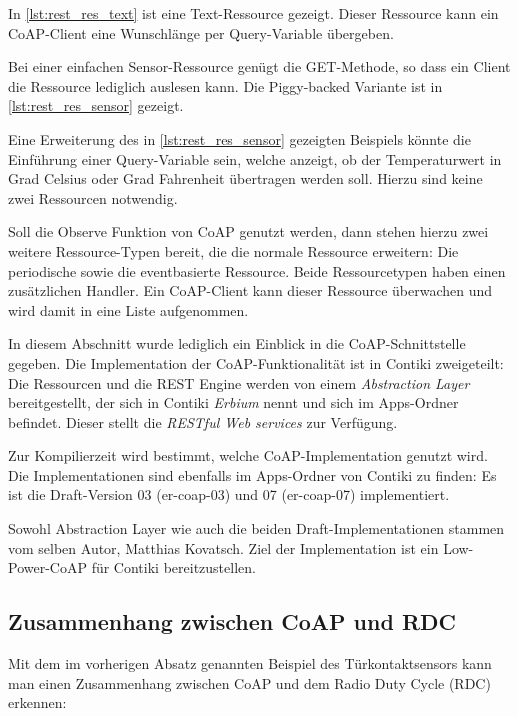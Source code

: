 	In \autoref{lst:rest_res_text} ist eine Text-Ressource gezeigt.
	Dieser Ressource kann ein CoAP-Client eine Wunschlänge
	per Query-Variable übergeben.

	

	Bei einer einfachen Sensor-Ressource genügt die GET-Methode, so dass
	ein Client die Ressource lediglich auslesen kann. Die Piggy-backed
	Variante ist in \autoref{lst:rest_res_sensor} gezeigt.

	

	Eine Erweiterung des in \autoref{lst:rest_res_sensor} gezeigten
	Beispiels könnte die Einführung einer Query-Variable sein,
	welche anzeigt, ob der Temperaturwert in Grad Celsius
	oder Grad Fahrenheit übertragen werden soll. Hierzu sind keine zwei
	Ressourcen notwendig.

	Soll die Observe Funktion von CoAP genutzt werden, dann stehen hierzu
	zwei weitere Ressource-Typen bereit, die die normale Ressource
	erweitern: Die periodische sowie die eventbasierte Ressource.
	Beide Ressourcetypen haben einen zusätzlichen Handler.
	Ein CoAP-Client kann dieser Ressource überwachen und wird damit
	in eine Liste aufgenommen.

	In diesem Abschnitt wurde lediglich ein Einblick in die
	CoAP-Schnittstelle gegeben. Die Implementation der CoAP-Funktionalität
	ist in Contiki zweigeteilt: Die Ressourcen und die REST Engine
	werden von einem \emph{Abstraction Layer} bereitgestellt, der sich
	in Contiki \emph{Erbium} nennt und sich im Apps-Ordner befindet.
	Dieser stellt die \emph{RESTful Web services} zur Verfügung.

	Zur Kompilierzeit wird bestimmt, welche CoAP-Implementation genutzt
	wird. Die Implementationen sind ebenfalls im Apps-Ordner von Contiki
	zu finden: Es ist die Draft-Version 03 (er-coap-03)
	und 07 (er-coap-07) implementiert.

	Sowohl Abstraction Layer wie auch die beiden Draft-Implementationen
	stammen vom selben Autor, Matthias Kovatsch. Ziel der Implementation
	ist ein Low-Power-CoAP \autocite{kovatsch11low-power} für Contiki
	bereitzustellen.

\subsection{Zusammenhang zwischen CoAP und RDC}
	Mit dem im vorherigen Absatz genannten Beispiel des Türkontaktsensors
	kann man einen Zusammenhang zwischen CoAP und dem Radio Duty Cycle (RDC)
	erkennen:

